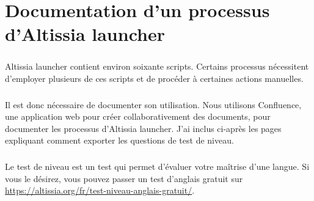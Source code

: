 \chapter{Documentation d'un processus d'Altissia launcher}
\label{ch:altissia-launcher-doc}

\paragraph{}
Altissia launcher contient environ soixante scripts.
Certains processus nécessitent d'employer plusieurs de ces scripts et de procéder à certaines actions manuelles.

\paragraph{}
Il est donc nécessaire de documenter son utilisation.
Nous utilisons Confluence, une application web pour créer collaborativement des documents, pour documenter les processus d'Altissia launcher.
J'ai inclus ci-après les pages expliquant comment exporter les questions de test de niveau.

\paragraph{}
Le test de niveau est un test qui permet d'évaluer votre maîtrise d'une langue.
Si vous le désirez, vous pouvez passer un test d'anglais gratuit sur \url{https://altissia.org/fr/test-niveau-anglais-gratuit/}.
    
